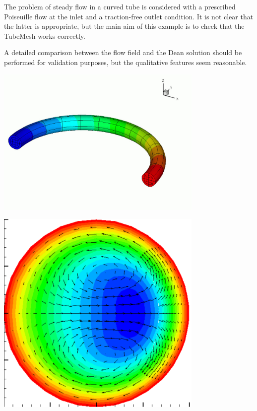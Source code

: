 The problem of steady flow in a curved tube is considered with a prescribed Poiseuille flow at the inlet and a traction-\/free outlet condition. It is not clear that the latter is appropriate, but the main aim of this example is to check that the {\ttfamily Tube\+Mesh} works correctly.

A detailed comparison between the flow field and the Dean solution should be performed for validation purposes, but the qualitative features seem reasonable.

 
\begin{DoxyImage}
\includegraphics[width=0.75\textwidth]{curve_geom}
\end{DoxyImage}


 
\begin{DoxyImage}
\includegraphics[width=0.75\textwidth]{curve_sec}
\end{DoxyImage}


